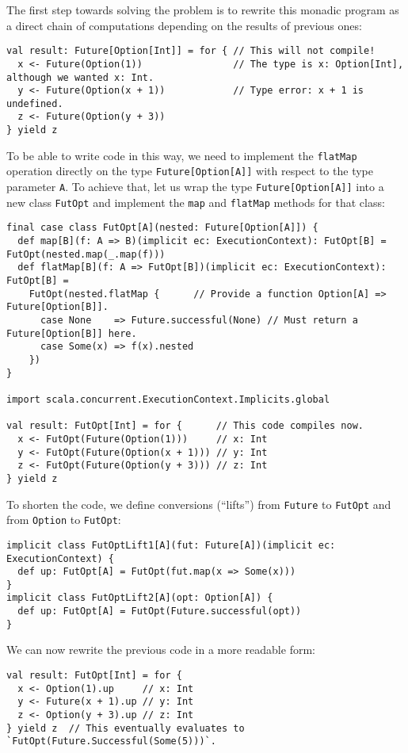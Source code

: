The first step towards solving the problem is to rewrite this monadic
program as a direct chain of computations depending on the results
of previous ones:
\begin{lstlisting}
val result: Future[Option[Int]] = for { // This will not compile!
  x <- Future(Option(1))                // The type is x: Option[Int], although we wanted x: Int.
  y <- Future(Option(x + 1))            // Type error: x + 1 is undefined.
  z <- Future(Option(y + 3))
} yield z
\end{lstlisting}
To be able to write code in this way, we need to implement the \lstinline!flatMap!
operation directly on the type \lstinline!Future[Option[A]]! with
respect to the type parameter \lstinline!A!. To achieve that, let
us wrap the type \lstinline!Future[Option[A]]! into a new class \lstinline!FutOpt!
and implement the \lstinline!map! and \lstinline!flatMap! methods
for that class:
\begin{lstlisting}
final case class FutOpt[A](nested: Future[Option[A]]) {
  def map[B](f: A => B)(implicit ec: ExecutionContext): FutOpt[B] = FutOpt(nested.map(_.map(f)))
  def flatMap[B](f: A => FutOpt[B])(implicit ec: ExecutionContext): FutOpt[B] =
    FutOpt(nested.flatMap {      // Provide a function Option[A] => Future[Option[B]].
      case None    => Future.successful(None) // Must return a Future[Option[B]] here.
      case Some(x) => f(x).nested
    })
}

import scala.concurrent.ExecutionContext.Implicits.global

val result: FutOpt[Int] = for {      // This code compiles now.
  x <- FutOpt(Future(Option(1)))     // x: Int
  y <- FutOpt(Future(Option(x + 1))) // y: Int
  z <- FutOpt(Future(Option(y + 3))) // z: Int
} yield z
\end{lstlisting}
To shorten the code, we define conversions (\textsf{``}lifts\textsf{''}) from \lstinline!Future!
to \lstinline!FutOpt! and from \lstinline!Option! to \lstinline!FutOpt!:
\begin{lstlisting}
implicit class FutOptLift1[A](fut: Future[A])(implicit ec: ExecutionContext) {
  def up: FutOpt[A] = FutOpt(fut.map(x => Some(x)))
}
implicit class FutOptLift2[A](opt: Option[A]) {
  def up: FutOpt[A] = FutOpt(Future.successful(opt))
}
\end{lstlisting}
We can now rewrite the previous code in a more readable form:
\begin{lstlisting}
val result: FutOpt[Int] = for {
  x <- Option(1).up     // x: Int
  y <- Future(x + 1).up // y: Int
  z <- Option(y + 3).up // z: Int
} yield z  // This eventually evaluates to `FutOpt(Future.Successful(Some(5)))`.
\end{lstlisting}

